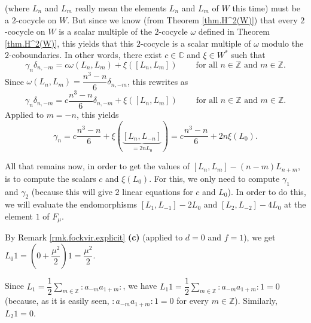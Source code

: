 \documentclass
[numbers=enddot,12pt,final,onecolumn,german,notitlepage]{scrartcl}%
\theoremstyle{definition}
\begin{document}
(where $L_{n}$ and $L_{m}$ really mean the elements $L_{n}$ and $L_{m}$ of $W$
this time) must be a $2$-cocycle on $W$. But since we know (from Theorem
\ref{thm.H^2(W)}) that every $2$-cocycle on $W$ is a scalar multiple of the
$2$-cocycle $\omega$ defined in Theorem \ref{thm.H^2(W)}, this yields that
this $2$-cocycle is a scalar multiple of $\omega$ modulo the $2$-coboundaries.
In other words, there exist $c\in\mathbb{C}$ and $\xi\in W^{\ast}$ such that%
\[
\gamma_{n}\delta_{n,-m}=c\omega\left(  L_{n},L_{m}\right)  +\xi\left(  \left[
L_{n},L_{m}\right]  \right)  \ \ \ \ \ \ \ \ \ \ \text{for all }n\in
\mathbb{Z}\text{ and }m\in\mathbb{Z}.
\]
Since $\omega\left(  L_{n},L_{m}\right)  =\dfrac{n^{3}-n}{6}\delta_{n,-m}$,
this rewrites as%
\[
\gamma_{n}\delta_{n,-m}=c\dfrac{n^{3}-n}{6}\delta_{n,-m}+\xi\left(  \left[
L_{n},L_{m}\right]  \right)  \ \ \ \ \ \ \ \ \ \ \text{for all }n\in
\mathbb{Z}\text{ and }m\in\mathbb{Z}.
\]
Applied to $m=-n$, this yields%
\begin{equation}
\gamma_{n}=c\dfrac{n^{3}-n}{6}+\xi\left(  \underbrace{\left[  L_{n}%
,L_{-n}\right]  }_{=2nL_{0}}\right)  =c\dfrac{n^{3}-n}{6}+2n\xi\left(
L_{0}\right)  . \label{pf.fockvir.answer2.2}%
\end{equation}


All that remains now, in order to get the values of $\left[  L_{n}%
,L_{m}\right]  -\left(  n-m\right)  L_{n+m}$, is to compute the scalars $c$
and $\xi\left(  L_{0}\right)  $. For this, we only need to compute $\gamma
_{1}$ and $\gamma_{2}$ (because this will give $2$ linear equations for $c$
and $L_{0}$). In order to do this, we will evaluate the endomorphisms $\left[
L_{1},L_{-1}\right]  -2L_{0}$ and $\left[  L_{2},L_{-2}\right]  -4L_{0}$ at
the element $1$ of $F_{\mu}$.

By Remark \ref{rmk.fockvir.explicit} \textbf{(c)} (applied to $d=0$ and
$f=1$), we get $L_{0}1=\left(  0+\dfrac{\mu^{2}}{2}\right)  1=\dfrac{\mu^{2}%
}{2}$.

Since $L_{1}=\dfrac{1}{2}\sum\limits_{m\in\mathbb{Z}}\left.  :a_{-m}%
a_{1+m}:\right.  $, we have $L_{1}1=\dfrac{1}{2}\sum\limits_{m\in\mathbb{Z}%
}\left.  :a_{-m}a_{1+m}:\right.  1=0$ (because, as it is easily seen, $\left.
:a_{-m}a_{1+m}:\right.  1=0$ for every $m\in\mathbb{Z}$). Similarly,
$L_{2}1=0$.
\end{document}
